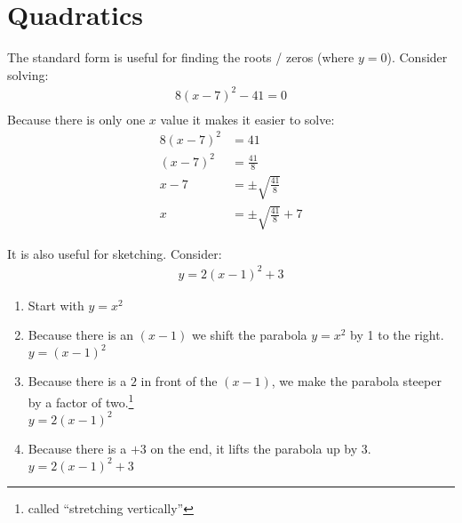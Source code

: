 \section{Quadratics}
The standard form is useful for finding the roots / zeros (where $y = 0$).
Consider solving:
\begin{align}
  8(x - 7)^{2} - 41 = 0 \\
\end{align}
Because there is only one $x$ value it makes it easier to solve:
\begin{align}
  8(x - 7)^{2} & = 41 \\
  (x - 7)^{2}  & = \frac{41}{8} \\
  x - 7        & = \pm \sqrt{\frac{41}{8}} \\
  x            & = \pm \sqrt{\frac{41}{8}} + 7
\end{align}

It is also useful for sketching. Consider:
\begin{align}
  y = 2(x-1)^{2} + 3
\end{align}
\begin{enumerate}
  \item Start with $y = x^2$
  
  \item Because there is an $(x - 1)$ we shift the parabola $y = x^2$ by 1 to
  the right.\\
  $y = (x - 1)^2$
  
  \item Because there is a $2$ in front of the $(x-1)$, we make the parabola
  steeper by a factor of two.\footnote{called ``stretching vertically''} \\
  $y = 2(x - 1)^2$
  
  \item Because there is a $+3$ on the end, it lifts the parabola up by 3. \\
  $y = 2(x - 1)^2 +3$
\end{enumerate}

